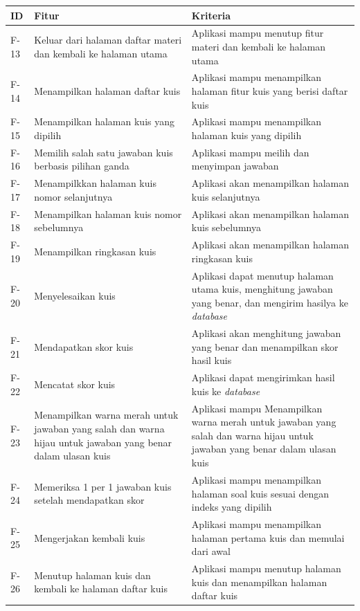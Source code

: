 \newpage
\begin{table}[H]
	\begin{tabular}{|m{1cm}|p{}|p{}|}
		\hline
		\centering\textbf{ID} & \centering\textbf{Fitur} & \multicolumn{1}{m{0.45\textwidth}|}{\centering \textbf{Kriteria}} \\
		\hline
		F-13&Keluar dari halaman daftar materi dan kembali ke halaman utama& Aplikasi mampu menutup fitur materi dan kembali ke halaman utama \\
		\hline
		F-14 &Menampilkan halaman daftar kuis&  Aplikasi mampu menampilkan halaman fitur kuis yang berisi daftar kuis\\
		\hline
		F-15&Menampilkan halaman kuis yang dipilih&  Aplikasi mampu menampilkan halaman kuis yang dipilih \\
		\hline
		F-16&Memilih salah satu jawaban kuis berbasis pilihan ganda& Aplikasi mampu meilih dan menyimpan jawaban \\
		\hline
		F-17&Menampilkkan halaman kuis nomor selanjutnya& Aplikasi akan menampilkan halaman kuis selanjutnya\\
		\hline
		F-18&Menampilkan halaman kuis nomor sebelumnya& Aplikasi akan menampilkan halaman kuis sebelumnya \\
		\hline
		F-19&Menampilkan ringkasan kuis& Aplikasi akan menampilkan halaman ringkasan kuis  \\
		\hline
		F-20&Menyelesaikan kuis& Aplikasi dapat menutup halaman utama kuis, menghitung jawaban yang benar, dan mengirim hasilya ke \textit{database} \\
		\hline
		F-21&Mendapatkan skor kuis& Aplikasi akan  menghitung jawaban yang benar dan menampilkan skor hasil kuis \\
		\hline
		F-22&Mencatat skor kuis& Aplikasi dapat mengirimkan hasil kuis ke \textit{database}\\
		\hline
		F-23&Menampilkan warna merah untuk jawaban yang salah dan warna hijau untuk jawaban yang benar dalam ulasan kuis& Aplikasi mampu Menampilkan warna merah untuk jawaban yang salah dan warna hijau untuk jawaban yang benar dalam ulasan kuis  \\
		\hline
		F-24&Memeriksa 1 per 1 jawaban kuis setelah mendapatkan skor& Aplikasi mampu menampilkan halaman soal kuis sesuai dengan indeks yang dipilih \\
		\hline
		F-25&Mengerjakan kembali kuis& Aplikasi mampu menampilkan halaman pertama kuis dan memulai dari awal\\
		\hline
		F-26&Menutup halaman kuis dan kembali ke halaman daftar kuis& Aplikasi mampu menutup halaman kuis dan menampilkan halaman daftar kuis \\
		\hline
	\end{tabular}
\end{table}
